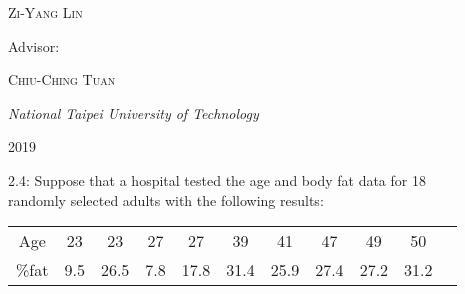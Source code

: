 \begin{titlepage}
	{\scshape\Large Zi-Yang Lin } %

	\vspace{0.5\baselineskip} %


	Advisor:

	\vspace{0.5\baselineskip} %
	
	{\scshape\Large Chiu-Ching Tuan} %
	
	\vspace{0.5\baselineskip} %
	
	\textit{National Taipei University of Technology} %
	
	\vfill %
	
	
	
	\vspace{0.3\baselineskip} %
	
	2019 %
	

\end{titlepage}


	\clearpage

	2.4: Suppose that a hospital tested the age and body fat data for 18 \\ randomly selected adults with the following results:

	\vspace{0.5\baselineskip}

	\begin{center}
	\begin{tabular}{ |c|c|c|c|c|c|c|c|c|c|c| } 
	\hline

	Age & 23 & 23 & 27 & 27 & 39 & 41 & 47 & 49 & 50 \\ 
	\%fat & 9.5 & 26.5 & 7.8 & 17.8 & 31.4 & 25.9 & 27.4 & 27.2 & 31.2 \\ 

	\hline
	\end{tabular}
	\end{center}

